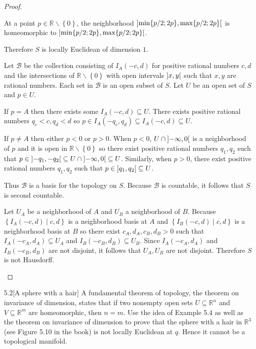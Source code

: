 \begin{proof}
\begin{enumerate}[label={(\alph*)}]
		      At a point \( p \in \mathbb{R} \smallsetminus \left\{0\right\} \), the neighborhood \( \left]{\min\{ p/2; 2p \}, \max\{ p/2; 2p \}}\right[ \) is homeomorphic to \( \left]{\min\{ p/2; 2p \}, \max\{ p/2; 2p \}}\right[ \).

		      Therefore \( S \) is locally Euclidean of dimension \(1\).

		      Let \( \mathscr{B} \) be the collection consisting of \( I_{A}(-c, d) \) for positive rational numbers \( c, d \) and the intersections of \( \mathbb{R} \smallsetminus \left\{0\right\} \) with open intervals \( \left]{x, y}\right[ \) such that \( x, y \) are rational numbers. Each set in \( \mathscr{B} \) is an open subset of \( S \). Let \( U \) be an open set of \( S \) and \( p \in U \).

		      If \( p = A \) then there exists some \( I_{A}(-c, d) \subseteq U \). There exists positive rational numbers \( q_{c} < c, q_{d} < d \) so \( p \in I_{A}(-q_{c}, q_{d}) \subseteq I_{A}(-c, d) \subseteq U \).

		      If \( p \ne A \) then either \( p < 0 \) or \( p > 0 \). When \( p < 0 \), \( U \cap \left]{-\infty, 0}\right[ \) is a neighborhood of \( p \) and it is open in \( \mathbb{R}\smallsetminus\left\{0\right\} \) so there exist positive rational numbers \( q_{1}, q_{2} \) such that \( p \in \left]{-q_{1}, -q_{2}}\right[ \subseteq U \cap \left]{-\infty, 0}\right[ \subseteq U \). Similarly, when \( p > 0 \), there exist positive rational numbers \( q_{1}, q_{2} \) such that \( p \in \left]{q_{1}, q_{2}}\right[ \subseteq U \).

		      Thus \( \mathscr{B} \) is a basis for the topology on \( S \). Because \( \mathscr{B} \) is countable, it follows that \( S \) is second countable.

		      Let \( U_{A} \) be a neighborhood of \( A \) and \( U_{B} \) a neighborhood of \( B \). Because \( \left\{ I_{A}(-c, d) \mid c, d \right\} \) is a neighborhood basis at \( A \) and \( \left\{ I_{B}(-c, d) \mid c, d \right\} \) is a neighborhood basis at \( B \) so there exist \( c_{A}, d_{A}, c_{B}, d_{B} > 0 \) such that \( I_{A}(-c_{A}, d_{A}) \subseteq U_{A} \) and \( I_{B}(-c_{B}, d_{B}) \subseteq U_{B} \). Since \( I_{A}(-c_{A}, d_{A}) \) and \( I_{B}(-c_{B}, d_{B}) \) are not disjoint, it follows that \( U_{A}, U_{B} \) are not disjoint. Therefore \( S \) is not Hausdorff.
	\end{enumerate}
\end{proof}

\begin{problem}{5.2}[A sphere with a hair]
A fundamental theorem of topology, the theorem on invariance of dimension, states that if two nonempty open sets \( U \subseteq \mathbb{R}^{n} \) and \( V \subseteq \mathbb{R}^{m} \) are homeomorphic, then \( n = m \). Use the idea of Example 5.4 as well as the theorem on invariance of dimension to prove that the sphere with a hair in \( \mathbb{R}^{3} \) (see Figure 5.10 in the book) is not locally Euclidean at \( q \). Hence it cannot be a topological manifold.
\end{problem}

